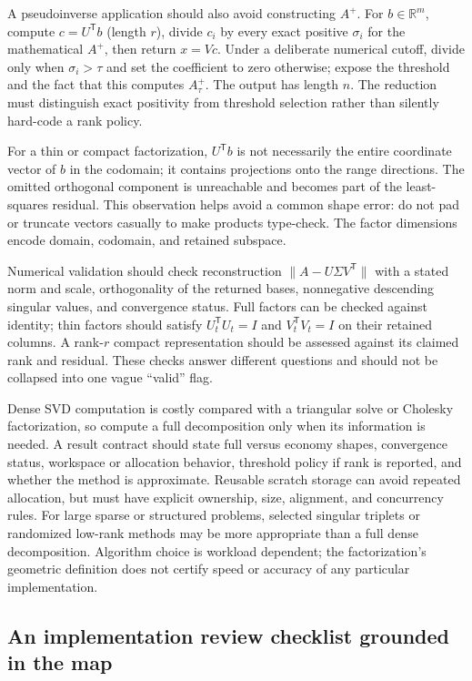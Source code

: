 A pseudoinverse application should also avoid constructing \(A^+\). For \(b\in\mathbb R^m\), compute \(c=U^\mathsf T b\) (length \(r\)), divide \(c_i\) by every exact positive \(\sigma_i\) for the mathematical \(A^+\), then return \(x=Vc\). Under a deliberate numerical cutoff, divide only when \(\sigma_i>\tau\) and set the coefficient to zero otherwise; expose the threshold and the fact that this computes \(A_\tau^+\). The output has length \(n\). The reduction must distinguish exact positivity from threshold selection rather than silently hard-code a rank policy.

For a thin or compact factorization, \(U^\mathsf T b\) is not necessarily the entire coordinate vector of \(b\) in the codomain; it contains projections onto the range directions. The omitted orthogonal component is unreachable and becomes part of the least-squares residual. This observation helps avoid a common shape error: do not pad or truncate vectors casually to make products type-check. The factor dimensions encode domain, codomain, and retained subspace.

Numerical validation should check reconstruction \(\|A-U\Sigma V^\mathsf T\|\) with a stated norm and scale, orthogonality of the returned bases, nonnegative descending singular values, and convergence status. Full factors can be checked against identity; thin factors should satisfy \(U_t^\mathsf T U_t=I\) and \(V_t^\mathsf T V_t=I\) on their retained columns. A rank-\(r\) compact representation should be assessed against its claimed rank and residual. These checks answer different questions and should not be collapsed into one vague ``valid'' flag.

Dense SVD computation is costly compared with a triangular solve or Cholesky factorization, so compute a full decomposition only when its information is needed. A result contract should state full versus economy shapes, convergence status, workspace or allocation behavior, threshold policy if rank is reported, and whether the method is approximate. Reusable scratch storage can avoid repeated allocation, but must have explicit ownership, size, alignment, and concurrency rules. For large sparse or structured problems, selected singular triplets or randomized low-rank methods may be more appropriate than a full dense decomposition. Algorithm choice is workload dependent; the factorization's geometric definition does not certify speed or accuracy of any particular implementation.

\subsection{An implementation review checklist grounded in the map}\label{an-implementation-review-checklist-grounded-in-the-map}

